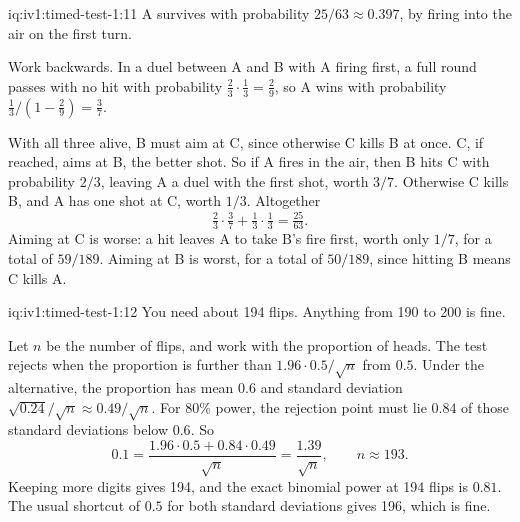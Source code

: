 \begin{solution}{iq:iv1:timed-test-1:11}
A survives with probability $25/63 \approx 0.397$, by firing into the air on the first turn.

Work backwards. In a duel between A and B with A firing first, a full round passes with no hit with probability $\tfrac23 \cdot \tfrac13 = \tfrac29$, so A wins with probability $\tfrac13/(1 - \tfrac29) = \tfrac37$.

With all three alive, B must aim at C, since otherwise C kills B at once. C, if reached, aims at B, the better shot. So if A fires in the air, then B hits C with probability $2/3$, leaving A a duel with the first shot, worth $3/7$. Otherwise C kills B, and A has one shot at C, worth $1/3$. Altogether
\[
\tfrac23 \cdot \tfrac37 + \tfrac13 \cdot \tfrac13 = \tfrac{25}{63}.
\]
Aiming at C is worse: a hit leaves A to take B's fire first, worth only $1/7$, for a total of $59/189$. Aiming at B is worst, for a total of $50/189$, since hitting B means C kills A.

\end{solution}

\begin{solution}{iq:iv1:timed-test-1:12}
You need about 194 flips. Anything from 190 to 200 is fine.

Let $n$ be the number of flips, and work with the proportion of heads. The test rejects when the proportion is further than $1.96 \cdot 0.5/\sqrt n$ from $0.5$. Under the alternative, the proportion has mean $0.6$ and standard deviation $\sqrt{0.24}/\sqrt n \approx 0.49/\sqrt n$. For 80\% power, the rejection point must lie $0.84$ of those standard deviations below $0.6$. So
\[
0.1 = \frac{1.96 \cdot 0.5 + 0.84 \cdot 0.49}{\sqrt n} = \frac{1.39}{\sqrt n}, \qquad n \approx 193 .
\]
Keeping more digits gives 194, and the exact binomial power at 194 flips is $0.81$. The usual shortcut of $0.5$ for both standard deviations gives 196, which is fine.

\end{solution}
